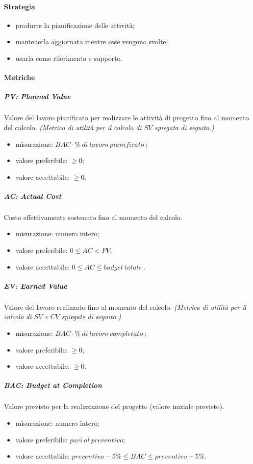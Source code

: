 		\paragraph{Strategia}
		\begin{itemize}
			\item produrre la pianificazione delle attività;
			\item mantenerla aggiornata mentre esse vengono svolte;
			\item usarla come riferimento e supporto.
		\end{itemize}		
		\paragraph{Metriche}
		\subparagraph{PV: Planned Value}
		Valore del lavoro pianificato per realizzare le attività di progetto fino al momento del calcolo.
		 \textit{(Metrica di utilità per il calcolo di $SV$ spiegata di seguito.)}
			\begin{itemize}
				\item  misurazione: $BAC \cdot \%\ di\ lavoro\ pianificato\ $;
				\item  valore preferibile: $ \geq 0$;
				\item  valore accettabile: $ \geq 0$.
			\end{itemize}	
		\subparagraph{AC: Actual Cost}
			Costo effettivamente sostenuto fino al momento del calcolo.
			\begin{itemize}
				\item  misurazione: numero intero;
				\item  valore preferibile: $0 \leq AC < PV$;
				\item  valore accettabile: $0 \leq AC \leq budget\ totale\ $.
			\end{itemize}
		\subparagraph{EV: Earned Value}
		Valore del lavoro realizzato fino al momento del calcolo.
		 \textit{(Metrica di utilità per il calcolo di $SV$ e $CV$ spiegate di seguito.)}
			\begin{itemize}
				\item  misurazione: $BAC \cdot \%\ di\ lavoro\ completato\ $;
				\item  valore preferibile: $ \geq 0$;
				\item  valore accettabile: $ \geq 0$.
			\end{itemize}
		\subparagraph{BAC: Budget at Completion}
		Valore previsto per la realizzazione del progetto (valore iniziale previsto).
		\begin{itemize}
			\item misurazione: numero intero;
			\item valore preferibile: $pari\ al\ preventivo$;
			\item valore accettabile: $preventivo -5\% \leq BAC \leq preventivo + 5\%$. 
		\end{itemize}
